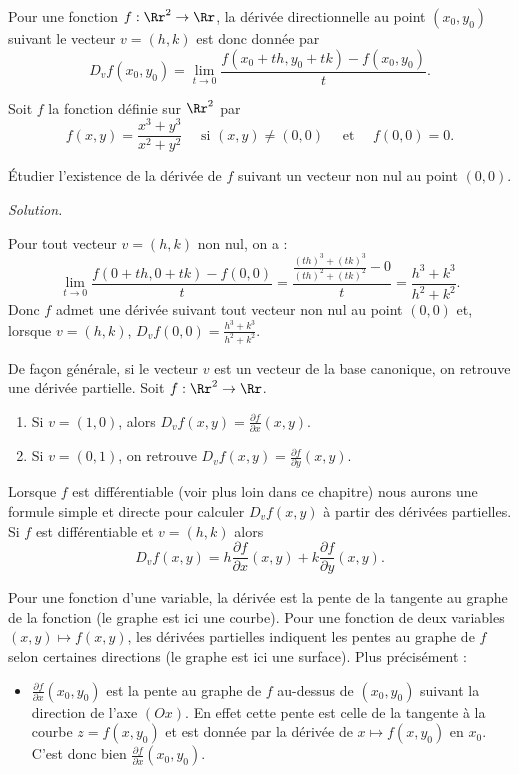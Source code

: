 \documentclass[12pt, class=report,crop=false]{standalone}
\begin{document}
{Pour une fonction $f : \Rr^2 \to \Rr$, la dérivée directionnelle au point $(x_0,y_0)$ suivant le vecteur $v=(h,k)$ est donc donnée par 
$$D_{v}f(x_0,y_0)= \lim_{t\to 0} \frac{f(x_0 + t h,y_0+tk)-f(x_0,y_0)}{t}.$$


\begin{exemple}
Soit $f$ la fonction définie sur $\Rr^2$ par
$$f(x,y)=\frac{x^3+y^3}{x^2+y^2} \quad \text{ si }(x,y)\neq (0,0)\quad \text{ et }\quad f(0,0)= 0.$$

\'Etudier l'existence de la dérivée de $f$ suivant un vecteur non nul au point $(0,0)$.


\bigskip
\emph{Solution.}

Pour tout vecteur $v=(h,k)$ non nul, on a :
$$\lim _{t\to 0}\frac{f(0+th,0+tk)-f(0,0)}{t}=
\frac{\frac{(th)^3+(tk)^3}{(th)^2+(tk)^2} - 0}{t} =
\frac{h^3+k^3}{h^2+k^2}.$$
Donc $f$ admet une dérivée suivant tout vecteur non nul au point $(0,0)$
et, lorsque $v=(h,k)$,  $D_v f (0,0) = \frac{h^3+k^3}{h^2+k^2}$.
\end{exemple}


\bigskip

De façon générale, si le vecteur $v$ est un vecteur de la base canonique, on retrouve une dérivée partielle. Soit $f : \Rr^2 \to \Rr$.
\begin{enumerate}
\item Si $v=(1,0)$, alors $D_{v}f(x,y) = \frac{\partial f}{\partial x}(x,y)$.
\item Si $v=(0,1)$, on retrouve $D_{v}f(x,y) = \frac{\partial f}{\partial y}(x,y)$.
\end{enumerate}

Lorsque $f$ est différentiable (voir plus loin dans ce chapitre) nous aurons une formule simple et directe pour calculer $D_vf(x,y)$ à partir des dérivées partielles.
Si $f$ est différentiable et $v=(h,k)$ alors
$$D_vf(x,y) = h \frac{\partial f}{\partial x}(x,y) + k \frac{\partial f}{\partial y}(x,y).$$
 

\bigskip
{}

Pour une fonction d'une variable, la dérivée est la pente de la tangente au graphe de la fonction (le graphe est ici une courbe). Pour une fonction de deux variables $(x,y) \mapsto f(x,y)$, les dérivées partielles indiquent les pentes au graphe de $f$ selon certaines directions (le graphe est ici une surface). Plus précisément :

\begin{itemize}
  \item $\frac{\partial f}{\partial x} (x_0,y_0)$ est la pente au graphe de $f$
 au-dessus de $(x_0,y_0)$ suivant la direction de l'axe $(Ox)$.
 En effet cette pente est celle de la tangente à la courbe $z = f(x,y_0)$ et est donnée par la dérivée de $x \mapsto f(x,y_0)$ en $x_0$. C'est donc bien $\frac{\partial f}{\partial x} (x_0,y_0)$.
 

\end{itemize}}
\end{document}
